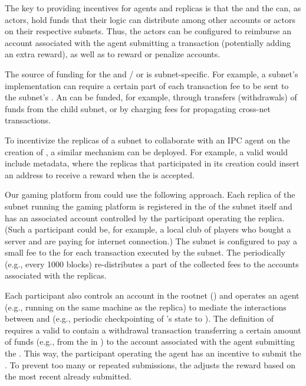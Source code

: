 The key to providing incentives for \ipc agents and replicas is that the \sa and the \gw can,
as actors, hold funds that their logic can distribute among other accounts or actors on their respective subnets.
Thus, the actors can be configured to reimburse an account associated with the \ipc agent submitting a transaction (potentially adding an extra reward), as well as to reward or penalize accounts.

The source of funding for the \gw and / or \sa is subnet-specific.
For example, a subnet’s implementation can require a certain part of each transaction fee to be sent to the subnet's \gw.
An \sa can be funded, for example, through transfers (withdrawals) of funds from the child subnet, or by charging fees for propagating cross-net transactions.

To incentivize the replicas of a subnet to collaborate with an IPC agent on the creation of \pofsFull, a similar mechanism can be deployed.
For example, a valid \pof would include metadata, where the replicas that participated in its creation could insert an address to receive a reward when the \pof is accepted.

\begin{example}
Our gaming platform from  could use the following approach.
Each replica of the  subnet running the gaming platform is registered in the \gw of the subnet itself and has an associated account controlled by the participant operating the replica.
(Such a participant could be, for example, a local club of players who bought a server and are paying for internet connection.)
The  subnet is configured to pay a small fee to the \gw for each transaction executed by the subnet.
The \gw periodically (e.g., every 1000 blocks) re-distributes a part of the collected fees to the accounts associated with the replicas.

Each participant also controls an account in the rootnet () and operates an \ipc agent (e.g., running on the same machine as the replica)
to mediate the interactions between  and  (e.g., periodic checkpointing of 's state to ).
The definition of  requires a valid \pof to contain a withdrawal transaction transferring a certain amount of funds (e.g., from the \gw in )
to the  account associated with the \ipc agent submitting the \pof.
This way, the participant operating the \ipc agent has an incentive to submit the \pof.
To prevent too many or repeated submissions, the  adjusts the reward based on the most recent \pof already submitted.

\end{example}

